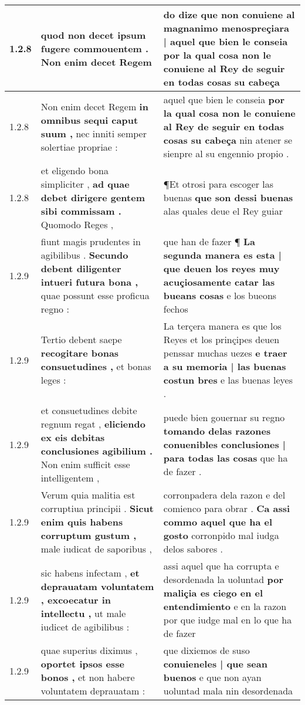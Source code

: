 \begin{tabular}{|p{1cm}|p{6.5cm}|p{6.5cm}|}
1.2.8 & quod non decet \textbf{ ipsum fugere commouentem . } Non enim decet Regem & do dize que non conuiene al magnanimo \textbf{ menospreçiara | aquel que bien le conseia } por la qual cosa non le conuiene al Rey de seguir en todas cosas su cabeça \\\hline
1.2.8 & Non enim decet Regem \textbf{ in omnibus sequi caput suum , } nec inniti semper solertiae propriae : & aquel que bien le conseia \textbf{ por la qual cosa non le conuiene al Rey de seguir en todas cosas su cabeça } nin atener se sienpre al su engennio propio . \\\hline
1.2.8 & et eligendo bona simpliciter , \textbf{ ad quae debet dirigere gentem sibi commissam . } Quomodo Reges , & ¶Et otrosi para escoger las buenas \textbf{ que son dessi buenas } alas quales deue el Rey guiar \\\hline
1.2.9 & fiunt magis prudentes in agibilibus . \textbf{ Secundo debent diligenter intueri futura bona , } quae possunt esse proficua regno : & que han de fazer ¶ \textbf{ La segunda manera es esta | que deuen los reyes muy acuçiosamente catar las bueans cosas } e los bueons fechos \\\hline
1.2.9 & Tertio debent saepe \textbf{ recogitare bonas consuetudines , } et bonas leges : & La terçera manera es que los Reyes et los prinçipes deuen penssar muchas uezes \textbf{ e traer a su memoria | las buenas costun bres } e las buenas leyes . \\\hline
1.2.9 & et consuetudines debite regnum regat , \textbf{ eliciendo ex eis debitas conclusiones agibilium . } Non enim sufficit esse intelligentem , & puede bien gouernar su regno \textbf{ tomando delas razones conuenibles conclusiones | para todas las cosas } que ha de fazer . \\\hline
1.2.9 & Verum quia malitia est corruptiua principii . \textbf{ Sicut enim quis habens corruptum gustum , } male iudicat de saporibus , & corronpadera dela razon e del comienco para obrar . \textbf{ Ca assi commo aquel que ha el gosto } corronpido mal iudga delos sabores . \\\hline
1.2.9 & sic habens infectam , \textbf{ et deprauatam voluntatem , excoecatur in intellectu , } ut male iudicet de agibilibus : & assi aquel que ha corrupta e desordenada la uoluntad \textbf{ por maliçia es ciego en el entendimiento } e en la razon por que iudge mal en lo que ha de fazer \\\hline
1.2.9 & quae superius diximus , \textbf{ oportet ipsos esse bonos , } et non habere voluntatem deprauatam : & que dixiemos de suso \textbf{ conuieneles | que sean buenos } e que non ayan uoluntad mala nin desordenada \\\hline

\end{tabular}

